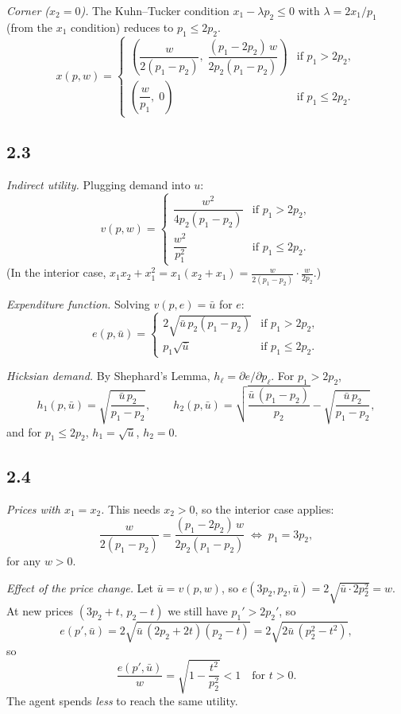 \documentclass[12pt,letterpaper]{article}
\begin{document}
\textit{Corner ($x_2=0$).} The Kuhn--Tucker condition $x_1-\lambda p_2\le0$ with $\lambda=2x_1/p_1$ (from the $x_1$ condition) reduces to $p_1\le2p_2$.
\[
x(p,w) = \begin{cases}
\left(\dfrac{w}{2(p_1-p_2)},\; \dfrac{(p_1-2p_2)\,w}{2p_2(p_1-p_2)}\right) & \text{if } p_1>2p_2,\\[14pt]
\left(\dfrac{w}{p_1},\; 0\right) & \text{if } p_1\le 2p_2 .
\end{cases}
\]

\subsection*{2.3}

\textit{Indirect utility.} Plugging demand into $u$:
\[
v(p,w) = \begin{cases}
\dfrac{w^2}{4p_2(p_1-p_2)} & \text{if } p_1>2p_2,\\[12pt]
\dfrac{w^2}{p_1^2} & \text{if } p_1\le 2p_2 .
\end{cases}
\]
(In the interior case, $x_1x_2+x_1^2=x_1(x_2+x_1)=\frac{w}{2(p_1-p_2)}\cdot\frac{w}{2p_2}$.)

\textit{Expenditure function.} Solving $v(p,e)=\bar u$ for $e$:
\[
e(p,\bar u) = \begin{cases}
2\sqrt{\bar u\,p_2(p_1-p_2)} & \text{if } p_1>2p_2,\\[6pt]
p_1\sqrt{\bar u} & \text{if } p_1\le 2p_2 .
\end{cases}
\]

\textit{Hicksian demand.} By Shephard's Lemma, $h_\ell=\partial e/\partial p_\ell$. For $p_1>2p_2$,
\[
h_1(p,\bar u)=\sqrt{\frac{\bar u\,p_2}{p_1-p_2}}, \qquad
h_2(p,\bar u)=\sqrt{\frac{\bar u\,(p_1-p_2)}{p_2}}-\sqrt{\frac{\bar u\,p_2}{p_1-p_2}} ,
\]
and for $p_1\le2p_2$, $h_1=\sqrt{\bar u}$, $h_2=0$.

\subsection*{2.4}

\textit{Prices with $x_1=x_2$.} This needs $x_2>0$, so the interior case applies:
\[
\frac{w}{2(p_1-p_2)}=\frac{(p_1-2p_2)\,w}{2p_2(p_1-p_2)} \;\Longleftrightarrow\; p_1=3p_2 ,
\]
for any $w>0$.

\textit{Effect of the price change.} Let $\bar u=v(p,w)$, so $e(3p_2,p_2,\bar u)=2\sqrt{\bar u\cdot 2p_2^2}=w$. At new prices $(3p_2+t,\,p_2-t)$ we still have $p_1'>2p_2'$, so
\[
e(p',\bar u)=2\sqrt{\bar u\,(2p_2+2t)(p_2-t)}=2\sqrt{2\bar u\,(p_2^2-t^2)},
\]
so
\[
\frac{e(p',\bar u)}{w}=\sqrt{1-\frac{t^2}{p_2^2}}<1 \quad\text{for } t>0 .
\]
The agent spends \emph{less} to reach the same utility.
\end{document}
